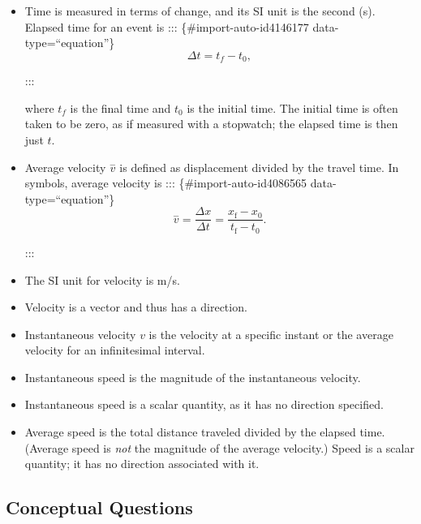 \documentclass[
]{book}
\begin{document}
\begin{itemize}
\item
  \protect\hypertarget{import-auto-id4070541}{}{Time is measured in terms of change, and its SI unit is the second
  (s). Elapsed time for an event is}
  ::: \{\#import-auto-id4146177 data-type=``equation''\}
  \[{\Delta t = {t_{f} - t_{0}},}{}\]

  :::

  where \(t_{f}{}\) is the final time and
  \emph{}\(t_{0}{}\) is the initial time. The
  initial time is often taken to be zero, as if measured with a
  stopwatch; the elapsed time is then just \(t{}\).
\item
  \protect\hypertarget{import-auto-id1770783}{}{Average velocity \(\overset{-}{v}{}\) is defined as displacement
  divided by the travel time. In symbols, average velocity
  is}
  ::: \{\#import-auto-id4086565 data-type=``equation''\}
  \[{{{\overset{-}{v} = \frac{\Delta x}{\Delta t}} = \frac{x_{\text{f}} - x_{0}}{t_{\text{f}} - t_{0}}}\text{.}}{}\]

  :::
\item
  \protect\hypertarget{import-auto-id1795857}{}{The SI unit for velocity is m/s.}
\item
  \protect\hypertarget{import-auto-id1795847}{}{Velocity is a vector and thus has a
  direction.}
\item
  \protect\hypertarget{import-auto-id4097170}{}{Instantaneous velocity \(v{}\) is the velocity at a specific instant
  or the average velocity for an infinitesimal
  interval.}
\item
  \protect\hypertarget{import-auto-id4097153}{}{Instantaneous speed is the magnitude of the instantaneous
  velocity.}
\item
  \protect\hypertarget{import-auto-id4097155}{}{Instantaneous speed is a scalar quantity, as it has no direction
  specified.}
\item
  \protect\hypertarget{import-auto-id4097159}{}{Average speed is the total distance traveled divided by the elapsed
  time. (Average speed is \emph{not} the magnitude of the average
  velocity.) Speed is a scalar quantity; it has no direction
  associated with it.}
\end{itemize}

\hypertarget{fs-id3505230}{}
\hypertarget{conceptual-questions-2}{%
\subsection{Conceptual Questions}\label{conceptual-questions-2}}
\end{document}
